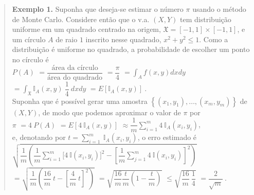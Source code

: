 \documentclass[
]{book}
\begin{document}
\begin{quote}
\textbf{Exemplo 1.} Suponha que deseja-se estimar o número \(\pi\) usando o método de Monte Carlo. Considere então que o v.a. \((X,Y)\) tem distribuição uniforme em um quadrado centrado na origem, \(\mathfrak{X}=[-1,1]\times[-1,1]\), e um círculo \(A\) de raio \(1\) inscrito nesse quadrado, \(x^2+y^2\leq 1.\) Como a distribuição é uniforme no quadrado, a probabilidade de escolher um ponto no círculo é\\
\(P(A)\) \(=\dfrac{\text{área da círculo}}{\text{área do quadrado}}\) \(=\dfrac{\pi}{4}\) \(= \displaystyle\int_A f(x,y) dxdy\) \(= \displaystyle\int_{\mathfrak{X}} \mathbb{I}_A(x,y)~\dfrac{1}{4}~dxdy\) \(=E\left[\mathbb{I}_A(x,y)\right]~.\)\\
Suponha que é possível gerar uma amostra \(\left\{(x_1,y_1),\ldots,(x_m,y_m)\right\}\) de \((X,Y)\), de modo que podemos aproximar o valor de \(\pi\) por\\
\(\pi\) \(=4~P(A)\) \(=E\left[4~\mathbb{I}_A(x,y)\right]\) \(\displaystyle \approx \dfrac{1}{m}\sum_{i=1}^m 4~\mathbb{I}_A(x_i,y_i)\),\\
e, denotando por \(\displaystyle t=\sum_{i=1}^m ~\mathbb{I}_A(x_i,y_i)\), o erro estimado é\\
\(\displaystyle \sqrt{\dfrac{1}{m}\left(\dfrac{1}{m}\sum_{i=1}^m\Big[4~\mathbb{I}(x_i,y_i)\Big]^2-\left[\dfrac{1}{m}\sum_{j=1}^m 4~\mathbb{I}(x_i,y_i)\right]^2\right)}\)
\(=\displaystyle \sqrt{\dfrac{1}{m}\left(\dfrac{16}{m}~t-\left[\dfrac{4}{m}~t\right]^2\right)}\)
\(= \displaystyle \sqrt{\dfrac{16}{m} \dfrac{t}{m}\left(1-\dfrac{t}{m}\right)}\)
\(\leq \displaystyle \sqrt{\dfrac{16}{m}~\dfrac{1}{4}}\)
\(= \dfrac{2}{\sqrt{m}}~.\)
\end{quote}
\end{document}
